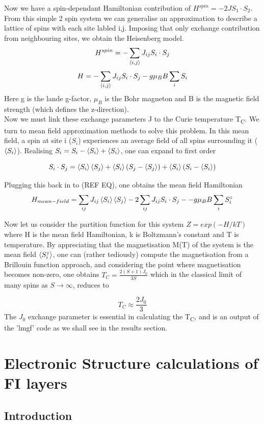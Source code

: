 \documentclass[12pt]{article}
\begin{document}
Now we have a spin-dependant Hamiltonian contribution of $H^{spin}=-2JS_1\cdot S_2$. From this simple 2 spin system we can generalise an approximation to describe a lattice of spins with each site labled i,j. Imposing that only exchange contribution from neighbouring sites, we obtain the Heisenberg model.
$$H^{spin}=-\sum_{\expval{i,j}}J_{ij}S_i \cdot S_j$$
$$H=-\sum_{\expval{i,j}}J_{ij}S_i \cdot S_j-g\mu_BB\sum_iS_i$$
Here g is the lande g-factor, $\mu_B$ is the Bohr magneton and B is the magnetic field strength (which defines the z-direction). 
\\
Now we must link these exchange parameters J to the Curie temperature T\textsubscript{C}. We turn to mean field approximation methods to solve this problem. In this mean field, a spin at site i ($S_i$) experiences an average field of all spins surrounding it ($\expval{S_i}$). Realising $S_i=S_i-\expval{S_i}+\expval{S_i}$, one can expand to first order

$$S_i\cdot S_j=\expval{S_i}\expval{S_j}+\expval{S_i}(S_j-\expval{S_j}) + \expval{S_i}(S_i-\expval{S_i})$$

Plugging this back in to (REF EQ), one obtains the mean field Hamiltonian
$$H_{mean-field}=\sum_{ij}J_{ij}\expval{S_i}\expval{S_j}-2\sum_{ij}J_{ij}S_i\cdot S_j--g\mu_BB\sum_iS^z_i$$

Now let us consider the partition function for this system $Z=exp(-H/kT)$ where H is the mean field Hamiltonian, k is Boltzmann's constant and T is temperature. By appreciating that the magnetisation M(T) of the system is the mean field $\expval{S^z_i}$, one can (rather tediously) compute the magnetisation from a Brillouin function approach, and considering the point where magnetisation becomes non-zero, one obtains $T_C=\frac{2(S+1)J_0}{3S}$ which in the classical limit of many spins as $S\rightarrow \infty $, reduces to

$$T_C\approx\frac{2J_0}{3}$$
The $J_0$ exchange parameter is essential in calculating the T\textsubscript{C}, and is an output of the 'lmgf' code as we shall see in the results section.

\section{Electronic Structure calculations of FI layers}

\subsection{Introduction}
\end{document}
